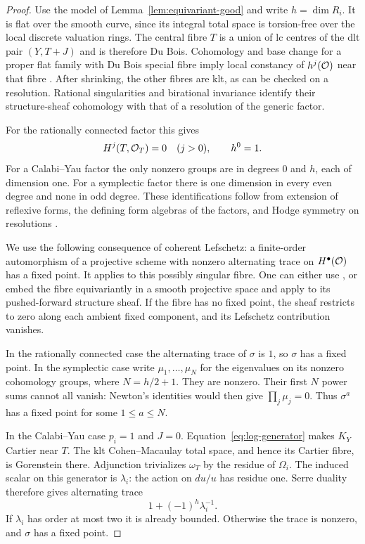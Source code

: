 \begin{proof}
Use the model of Lemma~\ref{lem:equivariant-good} and write
$h=\dim R_i$. It is flat over the smooth curve, since its integral
total space is torsion-free over the local discrete valuation rings.
The central fibre $T$ is a union of lc centres of the dlt pair
$(Y,T+J)$ and is therefore Du Bois. Cohomology and base change for a
proper flat family with Du Bois special fibre imply local constancy
of $h^j(\mathcal O)$ near that fibre
\cite[Theorem~2.62 and Corollary~2.64]{KollarFamilies}.
After shrinking, the other fibres are klt, as can be checked on a
resolution. Rational singularities and birational invariance identify
their structure-sheaf cohomology with that of a resolution of the
generic factor.

For the rationally connected factor this gives
\[
                   H^j(T,\mathcal O_T)=0\quad(j>0),\qquad h^0=1.
\]
For a Calabi--Yau factor the only nonzero groups are in degrees $0$
and $h$, each of dimension one. For a symplectic factor there is
one dimension in every even degree and none in odd degree.
These identifications follow from extension of reflexive forms,
the defining form algebras of the factors, and Hodge symmetry on
resolutions \cite{GKKP,HP}.

We use the following consequence of coherent Lefschetz:
a finite-order automorphism of a projective scheme with nonzero
alternating trace on $H^\bullet(\mathcal O)$ has a fixed point.
It applies to this possibly singular fibre. One can either use
\cite{BFQ}, or embed the fibre equivariantly in a smooth projective
space and apply \cite[Corollary~5.5]{Donovan} to its pushed-forward
structure sheaf. If the fibre has no fixed point, the sheaf restricts
to zero along each ambient fixed component, and its Lefschetz
contribution vanishes.

In the rationally connected case the alternating trace of $\sigma$
is $1$, so $\sigma$ has a fixed point. In the symplectic case write
$\mu_1,\ldots,\mu_N$ for the eigenvalues on its nonzero cohomology
groups, where $N=h/2+1$. They are nonzero. Their first $N$ power sums
cannot all vanish: Newton's identities would then give
$\prod_j\mu_j=0$. Thus $\sigma^a$ has a fixed point for some
$1\leq a\leq N$.

In the Calabi--Yau case $p_i=1$ and $J=0$.
Equation~\eqref{eq:log-generator} makes $K_Y$ Cartier near $T$.
The klt Cohen--Macaulay total space, and hence its Cartier fibre,
is Gorenstein there. Adjunction trivializes $\omega_T$ by the
residue of $\Omega_i$. The induced scalar on this generator is
$\lambda_i$: the action on $du/u$ has residue one.
Serre duality therefore gives alternating trace
\[
                            1+(-1)^h\lambda_i^{-1}.
\]
If $\lambda_i$ has order at most two it is already bounded.
Otherwise the trace is nonzero, and $\sigma$ has a fixed point.


\end{proof}
